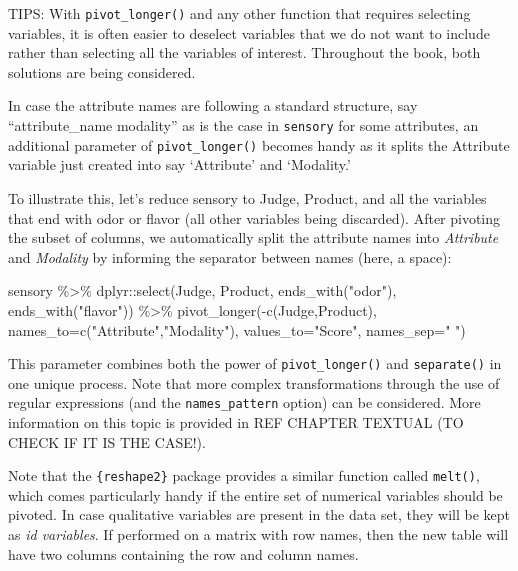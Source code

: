 \documentclass[
]{book}
\newenvironment{Shaded}{\begin{snugshade}}{\end{snugshade}}
\newcommand{\AttributeTok}[1]{\textcolor[rgb]{0.77,0.63,0.00}{#1}}
\newcommand{\FunctionTok}[1]{\textcolor[rgb]{0.00,0.00,0.00}{#1}}
\newcommand{\NormalTok}[1]{#1}
\newcommand{\SpecialCharTok}[1]{\textcolor[rgb]{0.00,0.00,0.00}{#1}}
\newcommand{\StringTok}[1]{\textcolor[rgb]{0.31,0.60,0.02}{#1}}
\begin{document}
TIPS: With \texttt{pivot\_longer()} and any other function that requires selecting variables, it is often easier to deselect variables that we do not want to include rather than selecting all the variables of interest. Throughout the book, both solutions are being considered.

In case the attribute names are following a standard structure, say ``attribute\_name modality'' as is the case in \texttt{sensory} for some attributes, an additional parameter of \texttt{pivot\_longer()} becomes handy as it splits the Attribute variable just created into say `Attribute' and `Modality.'

To illustrate this, let's reduce sensory to Judge, Product, and all the variables that end with odor or flavor (all other variables being discarded). After pivoting the subset of columns, we automatically split the attribute names into \emph{Attribute} and \emph{Modality} by informing the separator between names (here, a space):

\begin{Shaded}
\begin{Highlighting}[]
\NormalTok{sensory }\SpecialCharTok{\%\textgreater{}\%} 
\NormalTok{  dplyr}\SpecialCharTok{::}\FunctionTok{select}\NormalTok{(Judge, Product, }\FunctionTok{ends\_with}\NormalTok{(}\StringTok{"odor"}\NormalTok{), }\FunctionTok{ends\_with}\NormalTok{(}\StringTok{"flavor"}\NormalTok{)) }\SpecialCharTok{\%\textgreater{}\%} 
  \FunctionTok{pivot\_longer}\NormalTok{(}\SpecialCharTok{{-}}\FunctionTok{c}\NormalTok{(Judge,Product), }\AttributeTok{names\_to=}\FunctionTok{c}\NormalTok{(}\StringTok{"Attribute"}\NormalTok{,}\StringTok{"Modality"}\NormalTok{), }\AttributeTok{values\_to=}\StringTok{"Score"}\NormalTok{, }\AttributeTok{names\_sep=}\StringTok{" "}\NormalTok{)}
\end{Highlighting}
\end{Shaded}

This parameter combines both the power of \texttt{pivot\_longer()} and \texttt{separate()} in one unique process.
Note that more complex transformations through the use of regular expressions (and the \texttt{names\_pattern} option) can be considered. More information on this topic is provided in REF CHAPTER TEXTUAL (TO CHECK IF IT IS THE CASE!).

Note that the \texttt{\{reshape2\}} package provides a similar function called \texttt{melt()}, which comes particularly handy if the entire set of numerical variables should be pivoted. In case qualitative variables are present in the data set, they will be kept as \emph{id variables}. If performed on a matrix with row names, then the new table will have two columns containing the row and column names.
\end{document}
